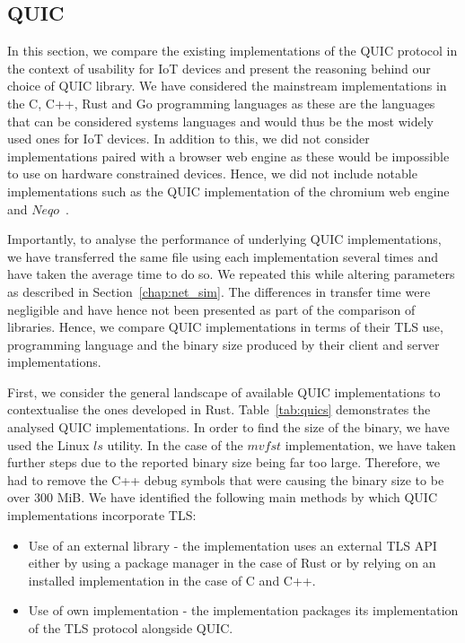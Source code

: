 \subsection{QUIC} \label{section:quic_impl}

In this section, we compare the existing implementations of the QUIC protocol in the context of usability for IoT devices and present the reasoning behind our choice of QUIC library.
We have considered the mainstream implementations in the C, C++, Rust and Go programming languages as these are the languages that can be considered systems languages and would thus be the most widely used ones for IoT devices.
In addition to this, we did not consider implementations paired with a browser web engine as these would be impossible to use on hardware constrained devices.
Hence, we did not include notable implementations such as the QUIC implementation of the chromium web engine~\citep{chromium_quic_2021} and $Neqo$~\citep{mozilla_neqo_2022}.

Importantly, to analyse the performance of underlying QUIC implementations, we have transferred the same file using each implementation several times and have taken the average time to do so.
We repeated this while altering parameters as described in Section~\ref{chap:net_sim}.
The differences in transfer time were negligible and have hence not been presented as part of the comparison of libraries.
Hence, we compare QUIC implementations in terms of their TLS use, programming language and the binary size produced by their client and server implementations.

First, we consider the general landscape of available QUIC implementations to contextualise the ones developed in Rust.
Table~\ref{tab:quics} demonstrates the analysed QUIC implementations.
In order to find the size of the binary, we have used the Linux $ls$ utility.
In the case of the $mvfst$ implementation, we have taken further steps due to the reported binary size being far too large.
Therefore, we had to remove the C++ debug symbols that were causing the binary size to be over 300 MiB.
We have identified the following main methods by which QUIC implementations incorporate TLS:

\begin{itemize}
    \item Use of an external library - the implementation uses an external TLS API either by using a package manager in the case of Rust or by relying on an installed implementation in the case of C and C++.
    \item Use of own implementation - the implementation packages its implementation of the TLS protocol alongside QUIC.
\end{itemize}

